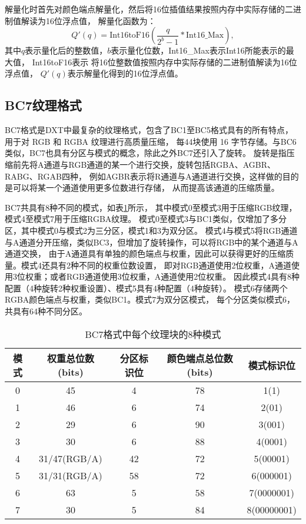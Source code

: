 解量化时首先对颜色端点解量化，然后将16位插值结果按照内存中实际存储的二进制值解读为16位浮点值，
解量化函数为：
\begin{equation}\label{eqn-6}
    Q'(q)=\text{Int16toF16}(\frac{q}{2^{b}-1}*\text{Int16\_Max}),
\end{equation}
其中$q$表示量化后的整数值，$b$表示量化位数，Int16\_Max表示Int16所能表示的最大值，
Int16toF16表示
将16位整数值按照内存中实际存储的二进制值解读为16位浮点值，
$Q'(q)$表示解量化得到的16位浮点值。



\subsection{BC7纹理格式}

BC7格式是DXT中最复杂的纹理格式，包含了BC1至BC5格式具有的所有特点，
用于对 RGB 和 RGBA 纹理进行高质量压缩，
每4\times4块使用 16 字节存储。与BC6类似，BC7也具有分区与模式的概念，除此之外BC7还引入了旋转。
旋转是指压缩前先将A通道与RGB通道的某一个进行交换，旋转包括RGBA、AGBR、RABG、RGAB四种，
例如AGBR表示将R通道与A通道进行交换，这样做的目的是可以将某一个通道使用更多位数进行存储，
从而提高该通道的压缩质量。

BC7共具有8种不同的模式，如表\ref{tab:BC7Mode}所示，
其中模式0至模式3用于压缩RGB纹理，模式4至模式7用于压缩RGBA纹理。
模式0至模式3与BC1类似，仅增加了多分区，其中模式0与模式2为三分区，模式1和3为双分区。
模式4与模式5将RGB通道与A通道分开压缩，类似BC3，但增加了旋转操作，可以将RGB中的某个通道与A通道交换，
由于A通道具有单独的颜色端点与权重，因此可以获得更好的压缩质量。模式4还具有2种不同的权重位数设置，
即对RGB通道使用2位权重，A通道使用3位权重；或者RGB通道使用3位权重，A通道使用2位权重。
因此模式4具有8种配置（4种旋转\times2种权重设置）、模式5具有4种配置（4种旋转）。
模式6存储两个RGBA颜色端点与权重，类似BC1。模式7为双分区模式，
每个分区类似模式6，共具有64种不同分区。

\begin{table}[htbp]
    \centering
    \caption{BC7格式中每个纹理块的8种模式\cite{BC7}}
    \label{tab:BC7Mode}        
    \begin{tabular}{ccccc}
    \toprule
    模式 & 权重总位数(bits) & 分区标识位 & 颜色端点总位数(bits) & 模式标识位\\
    \midrule
    0   &   45    &  4  &   78  &   1(1)   \\
    1   &   46    &  6  &   74  &   2(01)   \\
    2   &   29    &  6  &   90  &   3(001)   \\
    3   &   30    &  6  &   88  &   4(0001)   \\
    4   &   31/47(RGB/A)    &  42  &   72  &   5(00001)   \\
    5   &   31/31(RGB/A)    &  58  &   72  &   6(000001)   \\
    6   &   63    &  5  &   58  &   7(0000001)   \\
    7   &   30    &  5  &   84  &   8(00000001)   \\
    \bottomrule
    \end{tabular}
\end{table}

